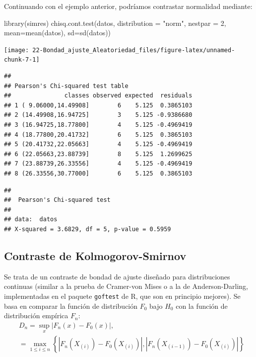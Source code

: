 \documentclass[
]{book}
\newenvironment{Shaded}{\begin{snugshade}}{\end{snugshade}}
\newcommand{\AttributeTok}[1]{\textcolor[rgb]{0.77,0.63,0.00}{#1}}
\newcommand{\DecValTok}[1]{\textcolor[rgb]{0.00,0.00,0.81}{#1}}
\newcommand{\FunctionTok}[1]{\textcolor[rgb]{0.00,0.00,0.00}{#1}}
\newcommand{\NormalTok}[1]{#1}
\newcommand{\StringTok}[1]{\textcolor[rgb]{0.31,0.60,0.02}{#1}}
\theoremstyle{break}
\theoremstyle{nonumberplain}
\begin{document}
Continuando con el ejemplo anterior, podríamos contrastar normalidad mediante:

\begin{Shaded}
\begin{Highlighting}[]
\FunctionTok{library}\NormalTok{(simres)}
\FunctionTok{chisq.cont.test}\NormalTok{(datos, }\AttributeTok{distribution =} \StringTok{"norm"}\NormalTok{, }\AttributeTok{nestpar =} \DecValTok{2}\NormalTok{, }\AttributeTok{mean=}\FunctionTok{mean}\NormalTok{(datos), }\AttributeTok{sd=}\FunctionTok{sd}\NormalTok{(datos))}
\end{Highlighting}
\end{Shaded}

\begin{center}\texttt{[image: 22-Bondad\_ajuste\_Aleatoriedad\_files/figure-latex/unnamed-chunk-7-1]} \end{center}

\begin{verbatim}
## 
## Pearson's Chi-squared test table
##               classes observed expected  residuals
## 1 ( 9.06000,14.49908]        6    5.125  0.3865103
## 2 (14.49908,16.94725]        3    5.125 -0.9386680
## 3 (16.94725,18.77800]        4    5.125 -0.4969419
## 4 (18.77800,20.41732]        6    5.125  0.3865103
## 5 (20.41732,22.05663]        4    5.125 -0.4969419
## 6 (22.05663,23.88739]        8    5.125  1.2699625
## 7 (23.88739,26.33556]        4    5.125 -0.4969419
## 8 (26.33556,30.77000]        6    5.125  0.3865103
\end{verbatim}

\begin{verbatim}
## 
##  Pearson's Chi-squared test
## 
## data:  datos
## X-squared = 3.6829, df = 5, p-value = 0.5959
\end{verbatim}

\hypertarget{ks-test}{%
\subsection{Contraste de Kolmogorov-Smirnov}\label{ks-test}}

Se trata de un contraste de bondad de ajuste diseñado para distribuciones continuas
(similar a la prueba de Cramer-von Mises o a la de Anderson-Darling, implementadas en el paquete \texttt{goftest} de R, que son en principio mejores).
Se basa en comparar la función de distribución \(F_0\) bajo \(H_0\) con la función de distribución empírica \(F_n\):
\[\begin{aligned}
& D_n=\sup_{x}|F_n(x)-F_0(x)|,\\
& = \max_{1 \leq i \leq n} \left\{ |F_n(X_{(i)})-F_0(X_{(i)})|,|F_n(X_{(i-1)})-F_0(X_{(i)})| \right\}
\end{aligned}\]
\end{document}

